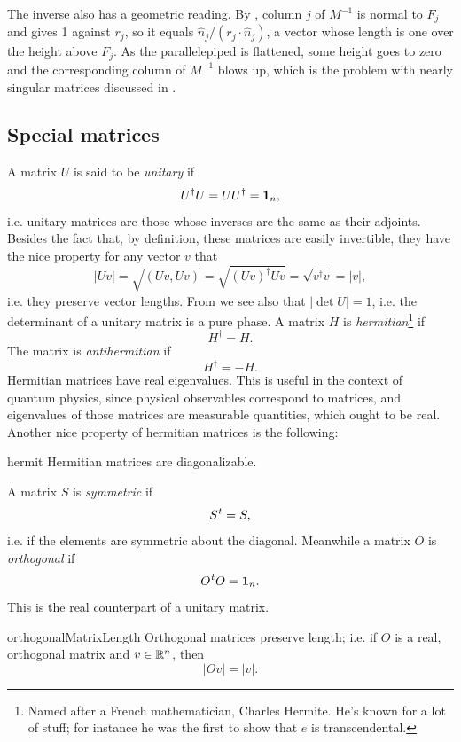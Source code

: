 The inverse also has a geometric reading. By
, column $j$ of $M^{-1}$ is normal to $F_j$ and
gives 1 against $r_j$, so it equals $\hat{n}_j/(r_j\cdot\hat{n}_j)$, a vector
whose length is one over the height above $F_j$. As the parallelepiped is flattened,
some height goes to zero and the corresponding column of $M^{-1}$ blows up,
which is the problem with nearly singular matrices discussed in
.


\subsection{Special matrices}\label{sec:specialMatrices}

A matrix $U$ is said to be {\it unitary} if
\begin{equation}\label{eq:unitary}
U^\dagger U=UU^\dagger={\mathbf 1}_n,
\end{equation}
i.e. unitary matrices are those whose inverses are the same as
their adjoints. Besides the fact that, by definition, these
matrices are easily invertible, they have the nice property 
for any vector $v$ that
\begin{equation}
|Uv|=\sqrt{(Uv,Uv)}=\sqrt{(Uv)^\dagger Uv}=\sqrt{v^\dagger v}=|v|,
\end{equation}
i.e. they preserve vector lengths. From
 we see also that $|\det U|=1$, i.e. the determinant of a
unitary matrix is a pure phase.
  A matrix $H$ is {\it hermitian}\footnote{Named
after a French mathematician, Charles Hermite. He's known
for a lot of stuff; for instance he was the first to
show that $e$ is transcendental.} if
\begin{equation}
H^\dagger=H. 
\end{equation}
The matrix is {\it antihermitian} if
\begin{equation}
H^\dagger=-H. 
\end{equation}
Hermitian matrices have real eigenvalues.
This is useful in the context of quantum physics, since physical observables
correspond to matrices, and eigenvalues of those matrices are measurable
quantities, which ought to be real.
Another nice property of hermitian matrices is the following:

\begin{theorem}{}{hermit}
  Hermitian matrices are diagonalizable.
\end{theorem}

A matrix $S$ is {\it symmetric} if
\begin{equation}
\trans{S}=S,
\end{equation}
i.e. if the elements are symmetric about the diagonal.
Meanwhile a matrix $O$ is {\it orthogonal} if 
\begin{equation}
\trans{O}O=\id_n.
\end{equation}
This is
the real counterpart of a unitary matrix. 
\begin{proposition}{}{orthogonalMatrixLength}
Orthogonal matrices preserve length; i.e. if $O$ is
a real, orthogonal matrix and $v\in\mathbb{R}^n$, then 
$$
|Ov|=|v|.
$$
\end{proposition}

